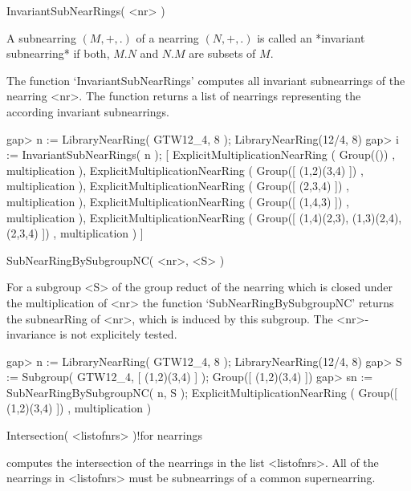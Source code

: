

\>InvariantSubNearRings( <nr> )

A subnearring $(M,+,.)$ of a nearring $(N,+,.)$ is called an 
*invariant subnearring* if both, $M . N$ and $N . M$ are subsets of $M$.

The function `InvariantSubNearRings'  computes all invariant 
subnearrings of the nearring <nr>.
The function returns a list of nearrings representing the according 
invariant subnearrings.

\beginexample
    gap> n := LibraryNearRing( GTW12_4, 8 );
    LibraryNearRing(12/4, 8)
    gap> i := InvariantSubNearRings( n );
    [ ExplicitMultiplicationNearRing ( Group(()) , multiplication ),
      ExplicitMultiplicationNearRing ( Group([ (1,2)(3,4) ]) , multiplication ),
      ExplicitMultiplicationNearRing ( Group([ (2,3,4) ]) , multiplication ),
      ExplicitMultiplicationNearRing ( Group([ (1,4,3) ]) , multiplication ),
      ExplicitMultiplicationNearRing ( Group([ (1,4)(2,3), (1,3)(2,4), (2,3,4)
         ]) , multiplication ) ]
\endexample



\>SubNearRingBySubgroupNC( <nr>, <S> )

For a subgroup <S> of the group reduct of the nearring which is closed
under the multiplication of <nr> the function
`SubNearRingBySubgroupNC' returns the subnearRing of <nr>, which is
induced by this subgroup. The <nr>-invariance is not explicitely
tested.

\beginexample
    gap> n := LibraryNearRing( GTW12_4, 8 );            
    LibraryNearRing(12/4, 8)
    gap> S := Subgroup( GTW12_4, [ (1,2)(3,4) ] );
    Group([ (1,2)(3,4) ])
    gap> sn := SubNearRingBySubgroupNC( n, S );
    ExplicitMultiplicationNearRing ( Group([ (1,2)(3,4) ]) , multiplication )
\endexample



\>Intersection( <listofnrs> )!{for nearrings}

computes the intersection of the nearrings in the list <listofnrs>.
All of the nearrings in <listofnrs> must be subnearrings of a common
supernearring.

